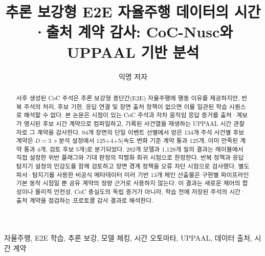 \documentclass[10pt,journal]{IEEEtran}
\title{추론 보강형 E2E 자율주행 데이터의 시간·출처 계약 감사: CoC-Nusc와 UPPAAL 기반 분석}
\author{익명 저자}
\newcommand{\uppaal}{\textsc{UPPAAL}\xspace}
\begin{document}
\maketitle

\begin{abstract}
사후 생성된 CoC 주석은 추론 보강형 종단간(E2E) 자율주행에 행동 이유를 제공하지만, 반복 주석의 처리, 후보 기한, 응답 연결 및 장면 출처 정책이 없으면 이를 일관된 학습 시퀀스로 해석할 수 없다. 본 논문은 시점이 있는 CoC 주석과 자차 움직임 응답 증거를 출처·계보가 명시된 후보 시간 계약으로 컴파일하고, 기록된 사건열을 재생하는 \uppaal 시간 관찰자로 그 계약을 감사한다. 94개 장면의 단일 이벤트 선별에서 얻은 134개 주석 사건별 후보 계약은 $D=3$~s 분석 설정에서 125+4+5(속도 변화 기준 계약 통과 125개, 이미 만족된 계약 통과 4개, 검토 후보 5개)로 분기되었다. 282개 모델과 1,128개 질의 결과는 레이블에서 직접 설정한 위반 플래그와 기대 판정의 직렬화 회귀 시험으로 한정한다. 반복 정책과 응답 탐지기 설정의 민감도를 함께 검토하고 장면 경계 정책을 오류 차단 시험으로 검사했다. 별도 파서·탐지기를 사용한 비공식 메타데이터 미러 기반 13개 체인 산출물은 구현별 파이프라인 기본 동작 시험일 뿐 공유 계약의 정량 근거로 사용하지 않는다. 이 결과는 새로운 제어의 합성이나 물리적 안전성, CoC 충실도의 독립 증거가 아니라, 학습 전에 저장된 주석의 시간·출처 계약을 점검하는 프로토콜 감사 결과로 해석한다.
\end{abstract}

\begin{IEEEkeywords}
자율주행, E2E 학습, 추론 보강, 모델 체킹, 시간 오토마타, UPPAAL, 데이터 출처, 시간 계약
\end{IEEEkeywords}














\end{document}
